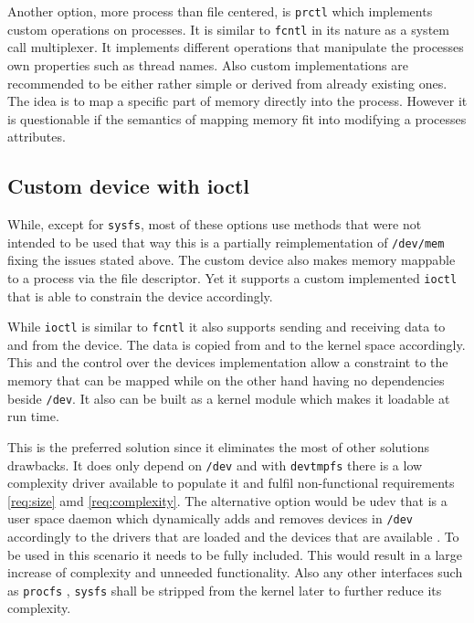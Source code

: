\documentclass[
a4paper,
11pt,
twoside
]{report}
\begin{document}
		Another option, more process than file centered, is \texttt{prctl} which implements custom operations on processes.
		It is similar to \texttt{fcntl} in its nature as a system call multiplexer.
		It implements different operations that manipulate the processes own properties such as thread names.
		Also custom implementations are recommended to be either rather simple or derived from already existing ones.
		The idea is to map a specific part of memory directly into the process.
		However it is questionable if the semantics of mapping memory fit into modifying a processes attributes. \citep{syscall} \citep{prctl}
		
		\subsection{Custom device with ioctl}
		\label{hwio}
		
		While, except for \texttt{sysfs}, most of these options use methods that were not intended to be used that way this is a partially reimplementation of \texttt{/dev/mem} fixing the issues stated above.
		The custom device also makes memory mappable to a process via the file descriptor.
		Yet it supports a custom implemented \texttt{ioctl} that is able to constrain the device accordingly.
		
		While \texttt{ioctl} is similar to \texttt{fcntl} it also supports sending and receiving data to and from the device.
		The data is copied from and to the kernel space accordingly.
		This and the control over the devices implementation allow a constraint to the memory that can be mapped while on the other hand having no dependencies beside \texttt{/dev}.
		It also can be built as a kernel module which makes it loadable at run time. \citep{ioctl}
		
		This is the preferred solution since it eliminates the most of other solutions drawbacks.
		It does only depend on \texttt{/dev} and with \texttt{devtmpfs} there is a low complexity driver available to populate it \citep{devtmpfs} and fulfil non-functional requirements \ref{req:size} amd \ref{req:complexity}.
		The alternative option would be udev that is a user space daemon which dynamically adds and removes devices in \texttt{/dev} accordingly to the drivers that are loaded and the devices that are available \citep{udev}.
		To be used in this scenario it needs to be fully included.
		This would result in a large increase of complexity and unneeded functionality.
		Also any other interfaces such as \texttt{procfs} \citep{procfs}, \texttt{sysfs} \citep{sysfs} shall be stripped from the kernel later to further reduce its complexity.
		
\end{document}
